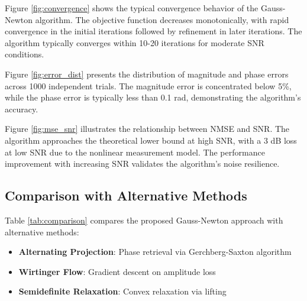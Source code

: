 \documentclass[journal]{IEEEtran}
\begin{document}

Figure \ref{fig:convergence} shows the typical convergence behavior of the Gauss-Newton algorithm. The objective function decreases monotonically, with rapid convergence in the initial iterations followed by refinement in later iterations. The algorithm typically converges within 10-20 iterations for moderate SNR conditions.

Figure \ref{fig:error_dist} presents the distribution of magnitude and phase errors across 1000 independent trials. The magnitude error is concentrated below 5\%, while the phase error is typically less than 0.1 rad, demonstrating the algorithm's accuracy.

Figure \ref{fig:mse_snr} illustrates the relationship between NMSE and SNR. The algorithm approaches the theoretical lower bound at high SNR, with a 3 dB loss at low SNR due to the nonlinear measurement model. The performance improvement with increasing SNR validates the algorithm's noise resilience.

\subsection{Comparison with Alternative Methods}
Table \ref{tab:comparison} compares the proposed Gauss-Newton approach with alternative methods:
\begin{itemize}
\item \textbf{Alternating Projection}: Phase retrieval via Gerchberg-Saxton algorithm
\item \textbf{Wirtinger Flow}: Gradient descent on amplitude loss
\item \textbf{Semidefinite Relaxation}: Convex relaxation via lifting
\end{itemize}
\end{document}
